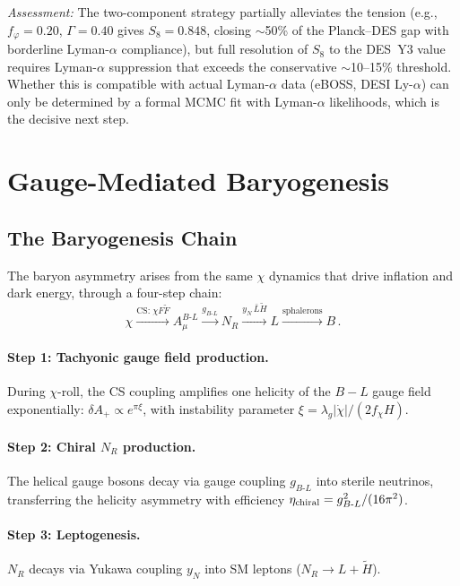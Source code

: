 \documentclass[a4paper,11pt]{article}
\newcommand{\chif}{\chi}
\newcommand{\fchi}{f_\chi}
\newcommand{\fphi}{f_\varphi}
\newcommand{\lag}{\lambda_g}
\newcommand{\gBL}{g_{B\text{-}L}}
\begin{document}
\textit{Assessment:} The two-component strategy partially alleviates the tension (e.g., $\fphi = 0.20$, $\Gamma = 0.40$ gives $S_8 = 0.848$, closing $\sim$50\% of the Planck--DES gap with borderline Lyman-$\alpha$ compliance), but full resolution of $S_8$ to the DES~Y3 value requires Lyman-$\alpha$ suppression that exceeds the conservative $\sim$10--15\% threshold. Whether this is compatible with actual Lyman-$\alpha$ data (eBOSS, DESI Ly-$\alpha$) can only be determined by a formal MCMC fit with Lyman-$\alpha$ likelihoods, which is the decisive next step.


\section{Gauge-Mediated Baryogenesis}
\label{sec:baryogenesis}

\subsection{The Baryogenesis Chain}

The baryon asymmetry arises from the same $\chif$ dynamics that drive inflation and dark energy, through a four-step chain:
\begin{equation}
\chif \xrightarrow{\text{CS:}\;\chif F\tilde{F}} A_\mu^{B\text{-}L} \xrightarrow{g_{B\text{-}L}} N_R \xrightarrow{y_N\,\bar{L}\tilde{H}} L \xrightarrow{\text{sphalerons}} B\,.
\end{equation}

\paragraph{Step 1: Tachyonic gauge field production.} During $\chif$-roll, the CS coupling amplifies one helicity of the $B\!-\!L$ gauge field exponentially: $\delta A_+ \propto e^{\pi\xi}$, with instability parameter $\xi = \lag|\dot{\chif}|/(2\fchi H)$.

\paragraph{Step 2: Chiral $N_R$ production.} The helical gauge bosons decay via gauge coupling $\gBL$ into sterile neutrinos, transferring the helicity asymmetry with efficiency $\eta_{\rm chiral} = g_{B\text{-}L}^2/(16\pi^2)$.

\paragraph{Step 3: Leptogenesis.} $N_R$ decays via Yukawa coupling $y_N$ into SM leptons ($N_R \to L + \tilde{H}$).
\end{document}
